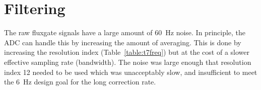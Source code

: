 






\section{Filtering}\label{sec:filter}

The raw fluxgate signals have a large amount of $60$~Hz noise. In principle, the ADC can handle this by increasing the amount of averaging. This is done by increasing the resolution index (Table~\ref{table:t7freq}) but at the cost of a slower effective sampling rate (bandwidth). The noise was large enough that resolution index 12 needed to be used which was unacceptably slow, and insufficient to meet the 6~Hz design goal for the long correction rate. 


